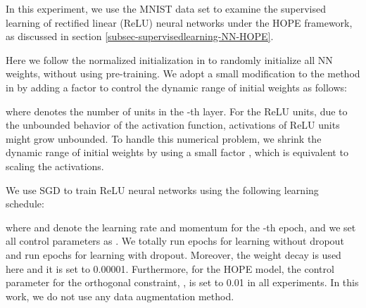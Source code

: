\documentclass[11pt]{article}
\begin{document}
In this experiment, we use the MNIST data set to examine the supervised learning of rectified linear (ReLU) neural networks under the HOPE framework, as discussed in section \ref{subsec-supervisedlearning-NN-HOPE}.

Here we follow the normalized initialization in \cite{glorot2010understanding} to randomly initialize all NN weights, without using pre-training.  We adopt a small modification to the method  in \cite{glorot2010understanding} by adding a factor to control the dynamic range of initial weights as follows:

where  denotes the number of units in the -th layer.
For the ReLU units, due to the unbounded behavior of the activation function, activations of ReLU units might grow unbounded. To handle this numerical problem, we shrink the dynamic range of initial weights by using a small factor , which is equivalent to scaling the activations. 

We use SGD to train  ReLU neural networks using the  following learning schedule:



where 
 and  denote the learning rate and momentum for the -th epoch, 
and we set all control parameters as .  We totally run  epochs for learning without dropout and run  epochs for learning with dropout. Moreover, the weight decay is used here and it is set to 0.00001. 
Furthermore, for the HOPE model, the control parameter for the orthogonal constraint, ,  is set to 0.01 in all experiments.
In this work, we do not use any data augmentation method. 
\end{document}
